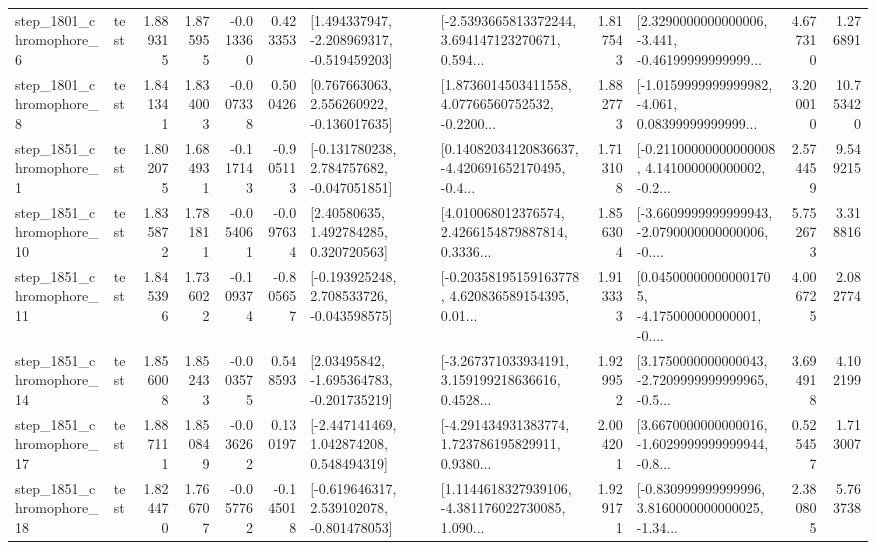 \begin{tabular}{llrrrrllrlrr}
  step\_1801\_chromophore\_6 &      test &      1.889315 &    1.875955 &     -0.013360 &  0.423353 &   [1.494337947, -2.208969317, -0.519459203] &  [-2.5393665813372244, 3.694147123270671, 0.594... &       1.817543 &  [2.3290000000000006, -3.441, -0.46199999999999... &            4.677310 &          1.276891 \\
  step\_1801\_chromophore\_8 &      test &      1.841341 &    1.834003 &     -0.007338 &  0.500426 &    [0.767663063, 2.556260922, -0.136017635] &  [1.8736014503411558, 4.07766560752532, -0.2200... &       1.882773 &  [-1.0159999999999982, -4.061, 0.08399999999999... &            3.200010 &         10.753420 \\
  step\_1851\_chromophore\_1 &      test &      1.802075 &    1.684931 &     -0.117143 & -0.905113 &   [-0.131780238, 2.784757682, -0.047051851] &  [0.14082034120836637, -4.420691652170495, -0.4... &       1.713108 &  [-0.21100000000000008, 4.141000000000002, -0.2... &            2.574459 &          9.549215 \\
 step\_1851\_chromophore\_10 &      test &      1.835872 &    1.781811 &     -0.054061 & -0.097634 &      [2.40580635, 1.492784285, 0.320720563] &  [4.010068012376574, 2.4266154879887814, 0.3336... &       1.856304 &  [-3.6609999999999943, -2.0790000000000006, -0.... &            5.752673 &          3.318816 \\
 step\_1851\_chromophore\_11 &      test &      1.845396 &    1.736022 &     -0.109374 & -0.805657 &   [-0.193925248, 2.708533726, -0.043598575] &  [-0.20358195159163778, 4.620836589154395, 0.01... &       1.913333 &  [0.045000000000001705, -4.175000000000001, -0.... &            4.006725 &          2.082774 \\
 step\_1851\_chromophore\_14 &      test &      1.856008 &    1.852433 &     -0.003575 &  0.548593 &    [2.03495842, -1.695364783, -0.201735219] &  [-3.267371033934191, 3.159199218636616, 0.4528... &       1.929952 &  [3.1750000000000043, -2.7209999999999965, -0.5... &            3.694918 &          4.102199 \\
 step\_1851\_chromophore\_17 &      test &      1.887111 &    1.850849 &     -0.036262 &  0.130197 &    [-2.447141469, 1.042874208, 0.548494319] &  [-4.291434931383774, 1.723786195829911, 0.9380... &       2.004201 &  [3.6670000000000016, -1.6029999999999944, -0.8... &            0.525457 &          1.713007 \\
 step\_1851\_chromophore\_18 &      test &      1.824470 &    1.766707 &     -0.057762 & -0.145018 &   [-0.619646317, 2.539102078, -0.801478053] &  [1.1144618327939106, -4.381176022730085, 1.090... &       1.929171 &  [-0.830999999999996, 3.8160000000000025, -1.34... &            2.380805 &          5.763738 \\

\end{tabular}
